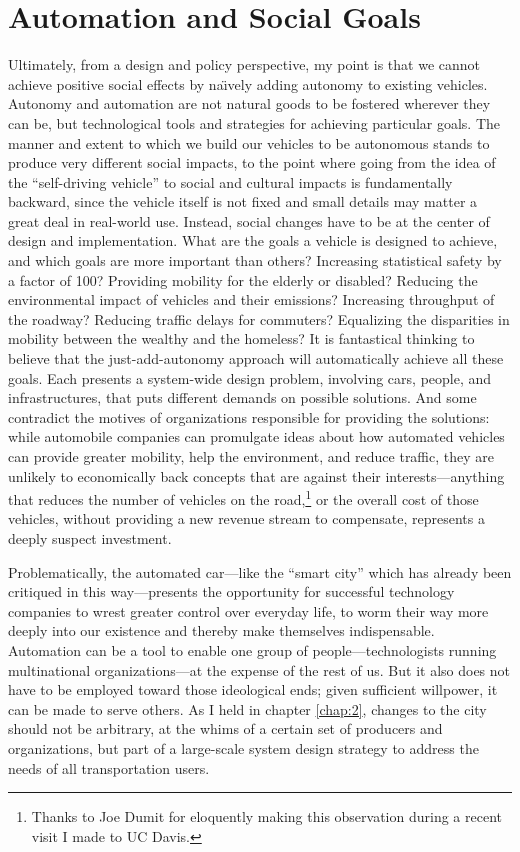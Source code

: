 \section{Automation and Social Goals}

Ultimately, from a design and policy perspective, my point is that we
cannot achieve positive social effects by na\"{\i}vely adding autonomy to
existing vehicles. Autonomy and automation are not natural goods to be
fostered wherever they can be, but technological tools and strategies
for achieving particular goals. The manner and extent to which we
build our vehicles to be autonomous stands to produce very different
social impacts, to the point where going from the idea of the
``self-driving vehicle'' to social and cultural impacts is
fundamentally backward, since the vehicle itself is not fixed and
small details may matter a great deal in real-world use. Instead,
social changes have to be at the center of design and implementation.
What are the goals a vehicle is designed to achieve, and which goals
are more important than others? Increasing
statistical safety by a factor of 100? Providing mobility for the
elderly or disabled? Reducing the environmental impact of vehicles and
their emissions? Increasing throughput of the roadway? Reducing
traffic delays for commuters? Equalizing the 
disparities in mobility between the wealthy and the homeless? It is
fantastical thinking to believe that the just-add-autonomy approach
will automatically achieve all these goals. Each presents a
system-wide design problem, involving cars, people, and
infrastructures, that puts different demands on possible solutions.
And some contradict the motives of organizations responsible for
providing the solutions:  while automobile companies can promulgate
ideas about how automated vehicles can provide greater mobility, help
the environment, and reduce traffic, they are unlikely to economically
back concepts that are against their interests---anything that reduces
the number of vehicles on the road,\footnote{Thanks to Joe Dumit for eloquently
  making this observation during a recent visit I made to UC Davis.}
or the overall cost of those 
vehicles, without providing a new revenue stream to compensate,
represents a deeply suspect investment. 

Problematically, the automated car---like the
``smart city'' which has already been critiqued in this
way\cite{???}---presents the opportunity for successful technology
companies to wrest greater control over everyday life, to worm their
way more deeply into our existence and thereby make themselves
indispensable. Automation can be a tool to enable one group of
people---technologists running multinational organizations---at the
expense of the rest of us.
But it also does not have to be employed toward those ideological
ends; given sufficient willpower, it can be made to serve others.
As I held in chapter \ref{chap:2}, changes to the city
should not be arbitrary, at the whims of a certain set of
producers and organizations, but part of a large-scale system design
strategy to address the needs of all transportation users.

